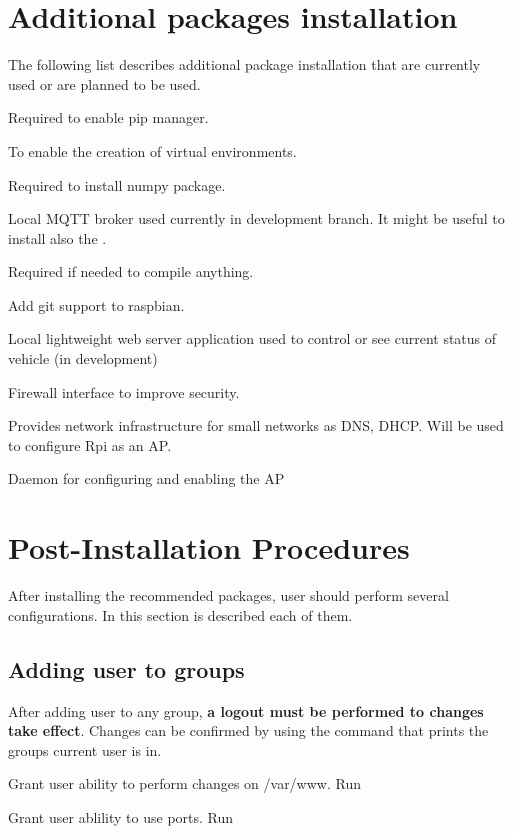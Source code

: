\section{Additional packages installation}
The following list describes additional package installation that are currently used or are planned to be used.
\begin{description}[style=nextline]
	\item[python3-pip] Required to enable pip manager.
	\item[python3-venv] To enable the creation of virtual environments.
	\item[libatlas-base-dev] Required to install numpy package.
	\item[mosquitto] Local \gls{MQTT} broker used currently in development branch. It might be useful to install also the .
	\item[build-essential] Required if needed to compile anything.
	\item[git] Add git support to raspbian.
	\item[nginx] Local lightweight web server application used to control or see current status of vehicle (in development) 
	\item[ufw] Firewall interface to improve security.
	\item[dnsmasq] Provides network infrastructure for small networks as \gls{DNS}, \gls{DHCP}. Will be used to configure \gls{Rpi} as an \gls{AP}.
	\item[hostapd] Daemon for configuring and enabling the \gls{AP}
\end{description}

\section{Post-Installation Procedures}
After installing the recommended packages, user should perform several configurations. In this section is described each of them.

\subsection{Adding user to groups}
After adding user to any group, \textbf{a logout must be performed to changes take effect}. Changes can be confirmed by using the command  that prints the groups current user is in.
\begin{description}[style=nextline]
	\item[www-data] Grant user ability to perform changes on /var/www. Run 
	\item[dialout] Grant user ablility to use ports. Run 
\end{description}

